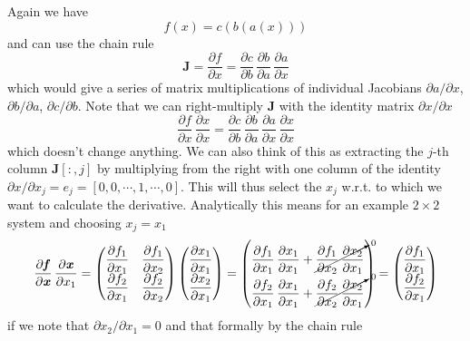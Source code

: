 \documentclass[paper=a4,11pt,headsepline]{scrartcl}
\newcommand{\ve}[1]{\ensuremath{\bm{\mathit{#1}}}}
\newcommand{\ma}[1]{\ensuremath{\bm{\mathbf{#1}}}}
\newcommand{\pd}[2]{\dfrac{\partial #1}{\partial #2}}
\newcommand{\pdi}[2]{\partial #1/\partial #2}
\begin{document}
Again we have
\begin{equation*}
    \ve f(\ve x) = \ve c(\ve b(\ve a(\ve x)))
\end{equation*}
and can use the chain rule
\begin{equation*}
    \ma J=\pd{\ve f}{\ve x} = \pd{\ve c}{\ve b}\,\pd{\ve b}{\ve a}\,\pd{\ve a}{\ve x}
\end{equation*}
which would give a series of matrix multiplications of individual Jacobians $\pdi{\ve
a}{\ve x}$, $\pdi{\ve b}{\ve a}$, $\pdi{\ve c}{\ve b}$.
Note that we can right-multiply $\ma J$ with the identity
matrix $\pdi{\ve x}{\ve x}$
\begin{equation*}
    \pd{\ve f}{\ve x}\,\pd{\ve x}{\ve x} =
    \pd{\ve c}{\ve b}\,\pd{\ve b}{\ve a}\,\pd{\ve a}{\ve x}\,\pd{\ve x}{\ve x}
\end{equation*}
which doesn't change anything. We can also think of this as extracting the
$j$-th column $\ma J[:,j]$ by multiplying from the right with one column of the
identity $\partial\ve x/\partial x_j = \ve e_j = [0,0,\cdots,1,\cdots, 0]$.
This will thus select the $x_j$ w.r.t. to which we want to calculate the
derivative. Analytically this means for an example $2\times 2$ system and choosing
$x_j = x_1$
\begin{equation*}
    \pd{\ve f}{\ve x}\,\pd{\ve x}{x_1}=
    \begin{pmatrix}
        \pd{f_1}{x_1} & \pd{f_1}{x_2} \\
        \pd{f_2}{x_1} & \pd{f_2}{x_2} \\
    \end{pmatrix}
    \begin{pmatrix}
        \pd{x_1}{x_1} \\
        \pd{x_2}{x_1} \\
    \end{pmatrix}
    =
    \begin{pmatrix}
        \pd{f_1}{x_1}\,\pd{x_1}{x_1} + \cancelto{0}{\pd{f_1}{x_2}\,\pd{x_2}{x_1}} \\
        \pd{f_2}{x_1}\,\pd{x_1}{x_1} + \cancelto{0}{\pd{f_2}{x_2}\,\pd{x_2}{x_1}} \\
    \end{pmatrix}
    =
    \begin{pmatrix}
        \pd{f_1}{x_1} \\
        \pd{f_2}{x_1} \\
    \end{pmatrix}
\end{equation*}
if we note that $\pdi{x_2}{x_1}=0$ and that formally by the chain rule
\end{document}
